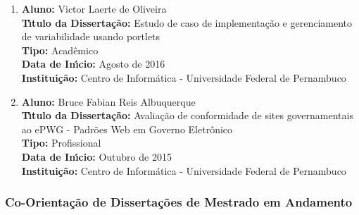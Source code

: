 \documentclass[a4paper,oneside,10pt]{article}
\begin{document}
\begin{enumerate}
\item       \textbf{Aluno:} Victor Laerte de Oliveira \mbox{}\\
            \textbf{T\'{\i}tulo da Disserta\c{c}\~{a}o:} Estudo de caso de implementação e gerenciamento de variabilidade usando portlets\\
            \textbf{Tipo:} Acadêmico\\
            \textbf{Data de In\'{\i}cio:} Agosto de 2016\\
            \textbf{Institui\c{c}\~{a}o:} Centro de Informática - Universidade Federal de Pernambuco
            
\item       \textbf{Aluno:} Bruce Fabian Reis Albuquerque \mbox{}\\
            \textbf{T\'{\i}tulo da Disserta\c{c}\~{a}o:} Avaliação de conformidade de sites governamentais ao ePWG - Padrões Web em Governo Eletrônico\\
            \textbf{Tipo:} Profissional\\
            \textbf{Data de In\'{\i}cio:} Outubro de 2015\\
            \textbf{Institui\c{c}\~{a}o:} Centro de Informática - Universidade Federal de Pernambuco
            
\end{enumerate}

\subsubsection{Co-Orienta\c{c}\~{a}o de Disserta\c{c}\~{o}es de Mestrado em Andamento}
\vspace{0.3cm}
\end{document}
